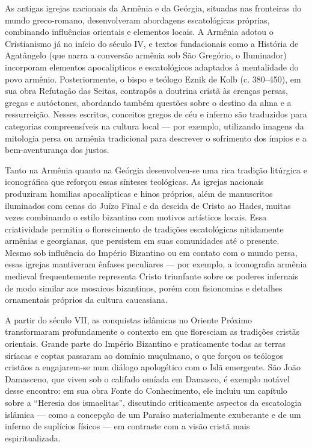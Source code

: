 As antigas igrejas nacionais da Armênia e da Geórgia, situadas nas fronteiras do mundo greco-romano, desenvolveram abordagens escatológicas próprias, combinando influências orientais e elementos locais. A Armênia adotou o Cristianismo já no início do século IV, e textos fundacionais como a História de Agatângelo (que narra a conversão armênia sob São Gregório, o Iluminador) incorporam elementos apocalípticos e escatológicos adaptados à mentalidade do povo armênio. Posteriormente, o bispo e teólogo Eznik de Kolb (c. 380--450), em sua obra Refutação das Seitas, contrapôs a doutrina cristã às crenças persas, gregas e autóctones, abordando também questões sobre o destino da alma e a ressurreição. Nesses escritos, conceitos gregos de céu e inferno são traduzidos para categorias compreensíveis na cultura local --- por exemplo, utilizando imagens da mitologia persa ou armênia tradicional para descrever o sofrimento dos ímpios e a bem-aventurança dos justos.

Tanto na Armênia quanto na Geórgia desenvolveu-se uma rica tradição litúrgica e iconográfica que reforçou essas sínteses teológicas. As igrejas nacionais produziram homilias apocalípticas e hinos próprios, além de manuscritos iluminados com cenas do Juízo Final e da descida de Cristo ao Hades, muitas vezes combinando o estilo bizantino com motivos artísticos locais. Essa criatividade permitiu o florescimento de tradições escatológicas nitidamente armênias e georgianas, que persistem em suas comunidades até o presente. Mesmo sob influência do Império Bizantino ou em contato com o mundo persa, essas igrejas mantiveram ênfases peculiares --- por exemplo, a iconografia armênia medieval frequentemente representa Cristo triunfante sobre os poderes infernais de modo similar aos mosaicos bizantinos, porém com fisionomias e detalhes ornamentais próprios da cultura caucasiana.

A partir do século VII, as conquistas islâmicas no Oriente Próximo transformaram profundamente o contexto em que floresciam as tradições cristãs orientais. Grande parte do Império Bizantino e praticamente todas as terras siríacas e coptas passaram ao domínio muçulmano, o que forçou os teólogos cristãos a engajarem-se num diálogo apologético com o Islã emergente. São João Damasceno, que viveu sob o califado omíada em Damasco, é exemplo notável desse encontro: em sua obra Fonte do Conhecimento, ele incluiu um capítulo sobre a “Heresia dos ismaelitas”, discutindo criticamente aspectos da escatologia islâmica --- como a concepção de um Paraíso materialmente exuberante e de um inferno de suplícios físicos --- em contraste com a visão cristã mais espiritualizada.

